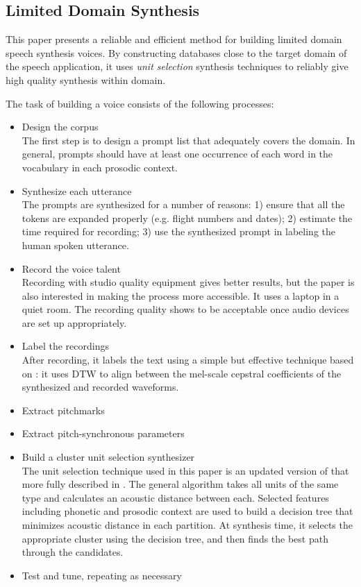 \subsection{Limited Domain Synthesis \cite{Black2000}}

This paper presents a reliable and efficient method for building limited domain speech synthesis voices. By constructing databases close to the target domain of the speech application, it uses \emph{unit selection} synthesis techniques to reliably give high quality synthesis within domain.

The task of building a voice consists of the following processes:
\begin{itemize}
\item{Design the corpus\\
The first step is to design a prompt list that adequately covers the domain. In general, prompts should have at least one occurrence of each word in the vocabulary in each prosodic context.
}
\item{Synthesize each utterance\\
The prompts are synthesized for a number of reasons: 1) ensure that all the tokens are expanded properly (e.g. flight numbers and dates); 2) estimate the time required for recording; 3) use the synthesized prompt in labeling the human spoken utterance.
}
\item{Record the voice talent\\
Recording with studio quality equipment gives better results, but the paper is also interested in making the process more accessible. It uses a laptop in a quiet room. The recording quality shows to be acceptable once audio devices are set up appropriately.
}
\item{Label the recordings\\
After recording, it labels the text using a simple but effective technique based on \cite{Malfrere1997}: it uses DTW to align between the mel-scale cepstral coefficients of the synthesized and recorded waveforms.
}
\item{Extract pitchmarks
}
\item{Extract pitch-synchronous parameters
}
\item{Build a cluster unit selection synthesizer\\
The unit selection technique used in this paper is an updated version of that more fully described in \cite{Black97}. The general algorithm takes all units of the same type and calculates an acoustic distance between each. Selected features including phonetic and prosodic context are used to build a decision tree that minimizes acoustic distance in each partition. At synthesis time, it selects the appropriate cluster using the decision tree, and then finds the best path through the candidates.
}
\item{Test and tune, repeating as necessary}
\end{itemize}

